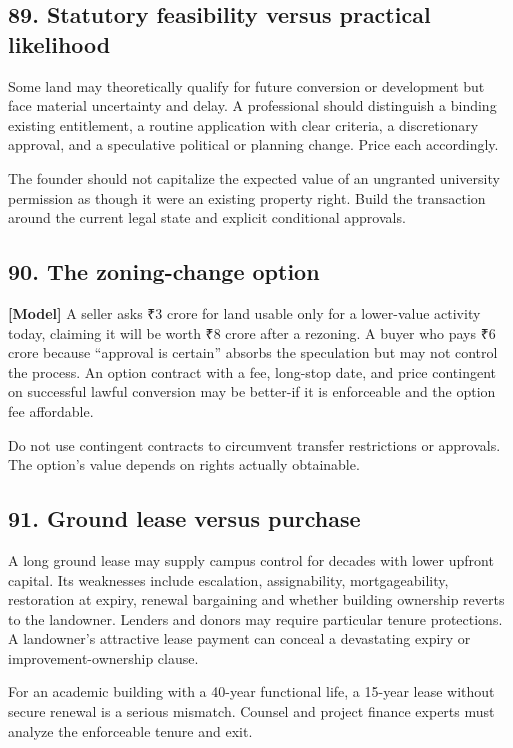 \subsection{89. Statutory feasibility versus practical likelihood}

Some land may theoretically qualify for future conversion or development but face material uncertainty and delay. A professional should distinguish a binding existing entitlement, a routine application with clear criteria, a discretionary approval, and a speculative political or planning change. Price each accordingly.

The founder should not capitalize the expected value of an ungranted university permission as though it were an existing property right. Build the transaction around the current legal state and explicit conditional approvals.


\subsection{90. The zoning-change option}

\textbf{[Model]} A seller asks \textnormal{₹}3 crore for land usable only for a lower-value activity today, claiming it will be worth \textnormal{₹}8 crore after a rezoning. A buyer who pays \textnormal{₹}6 crore because ``approval is certain'' absorbs the speculation but may not control the process. An option contract with a fee, long-stop date, and price contingent on successful lawful conversion may be better-if it is enforceable and the option fee affordable.

Do not use contingent contracts to circumvent transfer restrictions or approvals. The option's value depends on rights actually obtainable.


\subsection{91. Ground lease versus purchase}

A long ground lease may supply campus control for decades with lower upfront capital. Its weaknesses include escalation, assignability, mortgageability, restoration at expiry, renewal bargaining and whether building ownership reverts to the landowner. Lenders and donors may require particular tenure protections. A landowner's attractive lease payment can conceal a devastating expiry or improvement-ownership clause.

For an academic building with a 40-year functional life, a 15-year lease without secure renewal is a serious mismatch. Counsel and project finance experts must analyze the enforceable tenure and exit.


